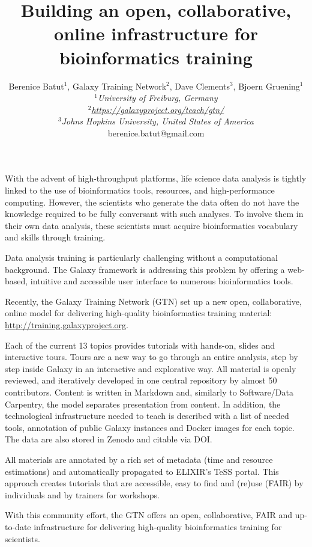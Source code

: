 \documentclass[english]{gcb17abstract}
\title{Building an open, collaborative, online infrastructure for bioinformatics training}
\author{Berenice Batut$^{1}$, Galaxy Training Network$^{2}$, Dave Clements$^{3}$, Bjoern Gruening$^{1}$
\\
{\normalsize\normalfont\itshape $^{1}$University of Freiburg, Germany\\
$^{2}$\href{https://galaxyproject.org/teach/gtn/}{https://galaxyproject.org/teach/gtn/}\\
$^{3}$Johns Hopkins University, United States of America\\}
berenice.batut@gmail.com
}
\begin{document}
\maketitle 

With the advent of high-throughput platforms, life science data analysis is tightly linked to the use of bioinformatics tools, resources, and high-performance computing. However, the scientists who generate the data often do not have the knowledge required to be fully conversant with such analyses. To involve them in their own data analysis, these scientists must acquire bioinformatics vocabulary and skills through training.

Data analysis training is particularly challenging without a computational background. The Galaxy framework is addressing this problem by offering a web-based, intuitive and accessible user interface to numerous bioinformatics tools.

Recently, the Galaxy Training Network (GTN) set up a new open, collaborative, online model for delivering high-quality bioinformatics training material: \href{http://training.galaxyproject.org}{http://training.galaxyproject.org}.

Each of the current 13 topics provides tutorials with hands-on, slides and interactive tours. Tours are a new way to go through an entire analysis, step by step inside Galaxy in an interactive and explorative way. All material is openly reviewed, and iteratively developed in one central repository by almost 50 contributors. Content is written in Markdown and, similarly to Software/Data Carpentry, the model separates presentation from content. In addition, the technological infrastructure needed to teach is described with a list of needed tools, annotation of public Galaxy instances and Docker images for each topic. The data are also stored in Zenodo and citable via DOI. 

All materials are annotated by a rich set of metadata (time and resource estimations) and automatically propagated to ELIXIR's TeSS portal. This approach creates tutorials that are accessible, easy to find and (re)use (FAIR) by individuals and by trainers for workshops. 

With this community effort, the GTN offers an open, collaborative, FAIR and up-to-date infrastructure for delivering high-quality bioinformatics training for scientists.


\end{document}
